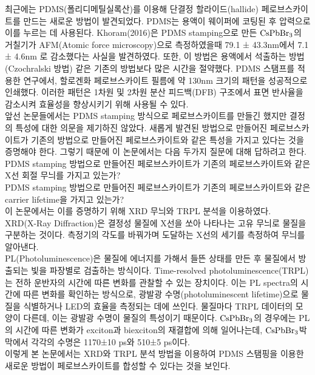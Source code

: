 최근에는 PDMS(폴리디메틸실록산)를 이용해 단결정 할라이드(hallide) 페로브스카이트를 만드는 새로운 방법이 발견되었다. PDMS는 용액이 웨이퍼에 코팅된 후 압력으로 이를 누르는 데 사용된다. Khoram(2016)은 PDMS stamping으로 만든 $\rm{CsPbBr_3}$의 거칠기가  AFM(Atomic force microscopy)으로 측정하였을때 79.1 ± 43.3nm에서 7.1 ± 4.6nm 로 감소했다는 사실을 발견하였다\cite{khoram2016growth}. 또한, 이 방법은 용액에서 석출하는 방법(Czochralski 방법) 같은 기존의 방법보다 많은 시간을 절약했다. PDMS 스탬프를 적용한 연구에서, 할로겐화 페로브스카이트 필름에 약 130nm 크기의 패턴을 성공적으로 인쇄했다\cite{brittman2017controlling}. 이러한 패턴은 1차원 및 2차원 분산 피드백(DFB) 구조에서 표면 반사율을 감소시켜 효율성을 향상시키기 위해 사용될 수 있다.\\
앞선 논문들에서는 PDMS stamping 방식으로 페로브스카이트를 만들긴 했지만 결정의 특성에 대한 의문을 제기하진 않았다. 새롭게 발견된 방법으로 만들어진 페로브스카이트가 기존의 방법으로 만들어진 페로브스카이트와 같은 특성을 가지고 있다는 것을 증명해야 한다. 그렇기 때문에 이 논문에서는 다음 두가지 질문에 대해 답하려고 한다.\\
PDMS stamping 방법으로 만들어진 페로브스카이트가 기존의 페로브스카이트와 같은 X선 회절 무늬를 가지고 있는가?\\ 
PDMS stamping 방법으로 만들어진 페로브스카이트가 기존의 페로브스카이트와 같은 carrier lifetime을 가지고 있는가?\\
 이 논문에서는 이를 증명하기 위해 XRD 무늬와 TRPL 분석을 이용하였다.\\
XRD(X-Ray Diffraction)은 결정성 물질에 X선을 쏘아 나타나는 고유 무늬로 물질을 구분하는 것이다. 측정기의 각도를 바꿔가며 도달하는 X선의 세기를 측정하여 무늬를 알아낸다.\\
 PL(Photoluminescence)은 물질에 에너지를 가해서 들뜬 상태를 만든 후 물질에서 방출되는 빛을 파장별로 검출하는 방식이다. Time-resolved photoluminescence(TRPL)는 전하 운반자의 시간에 따른 변화를 관찰할 수 있는 장치이다. 이는 PL spectra의 시간에 따른 변화를 확인하는 방식으로, 광발광 수명(photoluminescent lifetime)으로 물질을 식별하거나 LED의 효율을 측정되는 데에 쓰인다. 물질마다 TRPL 데이터의 모양이 다른데, 이는 광발광 수명이 물질의 특성이기 때문이다. $\rm{CsPbBr_3}$의 경우에는 PL의 시간에 따른 변화가 exciton과 biexciton의 재결합에 의해 일어나는데, $\rm{CsPbBr_3}$박막에서 각각의 수명은 1170±10 ps와 510±5 ps이다\cite{chen2018room}.\\
이렇게 본 논문에서는 XRD와 TRPL 분석 방법을 이용하여 PDMS 스탬핑을 이용한 새로운 방법이 페로브스카이트를 합성할 수 있다는 것을 보인다. 

